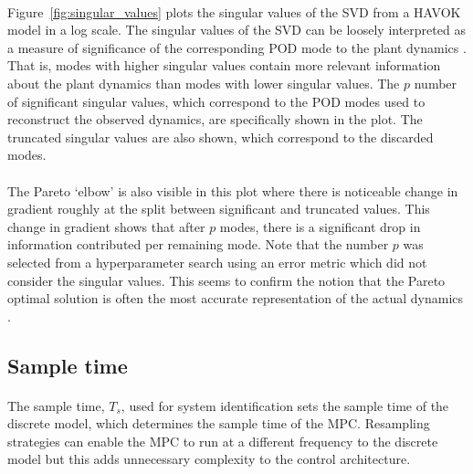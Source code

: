         

        \paragraph{}
        Figure~\ref{fig:singular_values} plots the singular values of the SVD from a HAVOK model in a log scale.
        The singular values of the SVD can be loosely interpreted as 
        a measure of significance of the corresponding POD mode to the plant dynamics \cite{Brunton2019d}. 
        That is, modes with higher singular values contain more relevant information about the plant dynamics 
        than modes with lower singular values.
        The $p$ number of significant singular values, 
        which correspond to the POD modes used to reconstruct the observed dynamics,
        are specifically shown in the plot.
        The truncated singular values are also shown, which correspond to the discarded modes.
        
        \paragraph{}
        The Pareto `elbow' is also visible in this plot where there is noticeable change in gradient
        roughly at the split between significant and truncated values.
        This change in gradient shows that after $p$ modes, 
        there is a significant drop in information contributed per remaining mode.
        Note that the number $p$ was selected from a hyperparameter search using an error metric
        which did not consider the singular values.
        This seems to confirm the notion that the Pareto optimal solution 
        is often the most accurate representation of the actual dynamics \cite{Brunton2019d}.

    \subsection{Sample time}

        \paragraph{}
        The sample time, $T_s$, used for system identification sets the sample time of the discrete model, 
        which determines the sample time of the MPC.
        Resampling strategies can enable the MPC to run at a different frequency to the discrete model but this adds unnecessary complexity to the control architecture.
        
